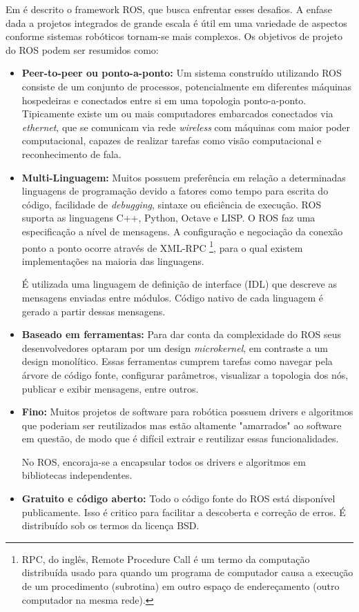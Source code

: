 Em \cite{quigley2009ros} é descrito o framework ROS, que busca enfrentar esses desafios. A enfase dada a projetos integrados de grande escala é útil em uma variedade de aspectos conforme sistemas robóticos tornam-se mais complexos. Os objetivos de projeto do ROS podem ser resumidos como: 
\begin{itemize}
\item \textbf{Peer-to-peer ou ponto-a-ponto:} Um sistema construído utilizando ROS consiste de um conjunto de processos, potencialmente em diferentes máquinas hospedeiras e conectados entre si em uma topologia ponto-a-ponto. Tipicamente existe um ou mais computadores embarcados conectados via \textit{ethernet}, que se comunicam via rede \textit{wireless} com máquinas com maior poder computacional, capazes de realizar tarefas como visão computacional e reconhecimento de fala. 

\item \textbf{Multi-Linguagem:} Muitos possuem preferência em relação a determinadas linguagens de programação devido a fatores como tempo para escrita do código, facilidade de \textit{debugging}, sintaxe ou eficiência de execução. ROS suporta as linguagens C++, Python, Octave e LISP. O ROS faz uma especificação a nível de mensagens. A configuração e negociação da conexão ponto a ponto ocorre através de XML-RPC \footnote{RPC, do inglês, Remote Procedure Call é um termo da computação distribuída usado para quando um programa de computador causa a execução de um procedimento (subrotina) em outro espaço de endereçamento (outro computador na mesma rede).}, para o qual existem implementações na maioria das linguagens.   

É utilizada uma linguagem de definição de interface (IDL) que descreve as mensagens enviadas entre módulos. Código nativo de cada linguagem é gerado a partir dessas mensagens. 


\item \textbf{Baseado em ferramentas:} Para dar conta da complexidade do ROS seus desenvolvedores optaram por um design \textit{microkernel}, em contraste a um design monolítico. Essas ferramentas cumprem tarefas como navegar pela árvore de código fonte, configurar parâmetros, visualizar a topologia dos nós, publicar e exibir mensagens, entre outros.

\item \textbf{Fino:} Muitos projetos de software para robótica possuem drivers e algoritmos que poderiam ser reutilizados mas estão altamente "amarrados" ao software em questão, de modo que é difícil extrair e reutilizar essas funcionalidades.

No ROS, encoraja-se a encapsular todos os drivers e algoritmos em bibliotecas independentes. 


\item \textbf{Gratuito e código aberto:} Todo o código fonte do ROS está disponível publicamente. Isso é critico para facilitar a descoberta e correção de erros. É distribuído sob os termos da licença BSD.  

\end{itemize}

